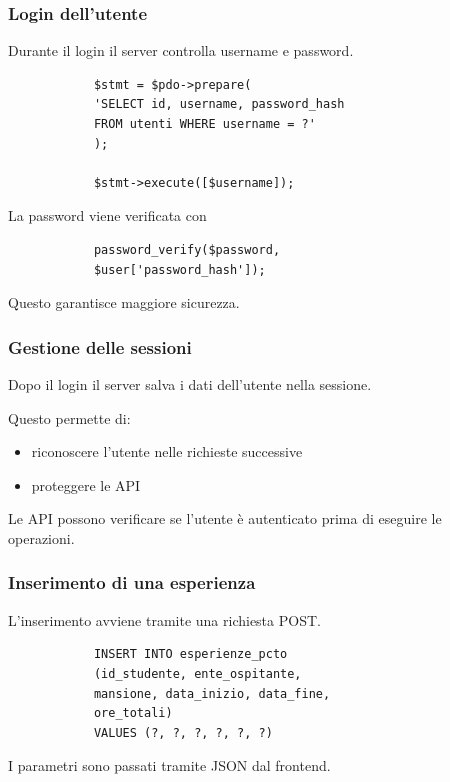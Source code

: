 \documentclass{beamer}
\begin{document}
	
	\begin{frame}[fragile]
		\frametitle{Login dell'utente}
		
		Durante il login il server controlla username e password.
		
		\begin{lstlisting}
			$stmt = $pdo->prepare(
			'SELECT id, username, password_hash
			FROM utenti WHERE username = ?'
			);
			
			$stmt->execute([$username]);
		\end{lstlisting}
		
		La password viene verificata con
		
		\begin{lstlisting}
			password_verify($password,
			$user['password_hash']);
		\end{lstlisting}
		
		Questo garantisce maggiore sicurezza.
		
	\end{frame}
	
	
	\begin{frame}
		\frametitle{Gestione delle sessioni}
		
		Dopo il login il server salva i dati dell'utente
		nella sessione.
		
		\bigskip
		
		Questo permette di:
		
		\begin{itemize}
			\item riconoscere l'utente nelle richieste successive
			\item proteggere le API
		\end{itemize}
		
		Le API possono verificare se l'utente è autenticato
		prima di eseguire le operazioni.
		
	\end{frame}
	
	
	\begin{frame}[fragile]
		\frametitle{Inserimento di una esperienza}
		
		L'inserimento avviene tramite una richiesta POST.
		
		\begin{lstlisting}
			INSERT INTO esperienze_pcto
			(id_studente, ente_ospitante,
			mansione, data_inizio, data_fine,
			ore_totali)
			VALUES (?, ?, ?, ?, ?, ?)
		\end{lstlisting}
		
		I parametri sono passati tramite JSON
		dal frontend.
		
	\end{frame}
	
\end{document}
